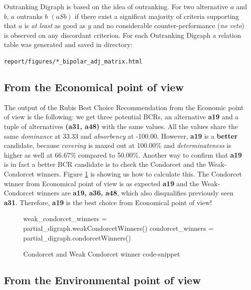 \documentclass[a4paper]{article}
\begin{document}
Outranking Digraph is based on the idea of outranking. For two alternative $a$ and $b$, $a$ outranks $b$ $(a S b)$ if there exist a significat majority of criteria supporting that $a$ is \emph{at least} as good as $y$ and no considerable counter-performance (\emph{no veto}) is observed on any discordant criterion. For each Outranking Digraph a relation table was generated and saved in directory:

\texttt{report/figures/*\_bipolar\_adj\_matrix.html} 

\subsection{From the Economical point of view}

The output of the Rubis Best Choice Recommendation from the Economic point of view is the following: we get three potential BCRs, an alternative \textbf{a19} and a tuple of alternatives \textbf{(a31, a48)} with the same values. All the values share the same \emph{dominance} at 33.33 and \emph{absorbency} at -100.00. However, \textbf{a19} is a \textbf{better} candidate, because \emph{covering} is maxed out at 100.00\% and \emph{determinateness} is higher as well at 66.67\% compared to 50.00\%. Another way to confirm that \textbf{a19} is in fact a better BCR candidate is to check the Condorcet and the Weak-Condorcet winners. Figure \ref{lst:condo} is showing us how to calculate this. The Condorcet winner from Economical point of view is as expected \textbf{a19} and the Weak-Condorcet winners are \textbf{a19, a36, a48}, which also disqualifies previously seen \textbf{a31}. Therefore, \textbf{a19} is the best choice from Economical point of view!

\begin{figure}[H]
	\begin{center}
		\begin{python}
weak_condorcet_winners = partial_digraph.weakCondorcetWinners()
condorcet_winners      = partial_digraph.condorcetWinners()
		\end{python}
	\end{center}
	\caption{Condorcet and Weak Condorcet winner code-snippet}
	\label{lst:condo}
\end{figure}



\subsection{From the Environmental point of view}
\label{sec:env}
\end{document}
